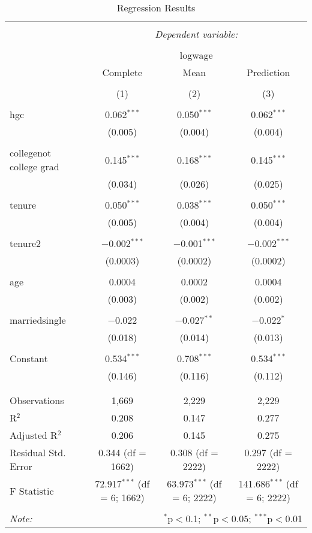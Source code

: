 \documentclass{article}
\begin{document}
\begin{table}[!htbp] \centering 
  \caption{Regression Results} 
  \label{} 
\begin{tabular}{@{\extracolsep{5pt}}lccc} 
\\[-1.8ex]\hline 
\hline \\[-1.8ex] 
 & \multicolumn{3}{c}{\textit{Dependent variable:}} \\ 
\cline{2-4} 
\\[-1.8ex] & \multicolumn{3}{c}{logwage} \\ 
 & Complete & Mean & Prediction \\ 
\\[-1.8ex] & (1) & (2) & (3)\\ 
\hline \\[-1.8ex] 
 hgc & 0.062$^{***}$ & 0.050$^{***}$ & 0.062$^{***}$ \\ 
  & (0.005) & (0.004) & (0.004) \\ 
  & & & \\ 
 collegenot college grad & 0.145$^{***}$ & 0.168$^{***}$ & 0.145$^{***}$ \\ 
  & (0.034) & (0.026) & (0.025) \\ 
  & & & \\ 
 tenure & 0.050$^{***}$ & 0.038$^{***}$ & 0.050$^{***}$ \\ 
  & (0.005) & (0.004) & (0.004) \\ 
  & & & \\ 
 tenure2 & $-$0.002$^{***}$ & $-$0.001$^{***}$ & $-$0.002$^{***}$ \\ 
  & (0.0003) & (0.0002) & (0.0002) \\ 
  & & & \\ 
 age & 0.0004 & 0.0002 & 0.0004 \\ 
  & (0.003) & (0.002) & (0.002) \\ 
  & & & \\ 
 marriedsingle & $-$0.022 & $-$0.027$^{**}$ & $-$0.022$^{*}$ \\ 
  & (0.018) & (0.014) & (0.013) \\ 
  & & & \\ 
 Constant & 0.534$^{***}$ & 0.708$^{***}$ & 0.534$^{***}$ \\ 
  & (0.146) & (0.116) & (0.112) \\ 
  & & & \\ 
\hline \\[-1.8ex] 
Observations & 1,669 & 2,229 & 2,229 \\ 
R$^{2}$ & 0.208 & 0.147 & 0.277 \\ 
Adjusted R$^{2}$ & 0.206 & 0.145 & 0.275 \\ 
Residual Std. Error & 0.344 (df = 1662) & 0.308 (df = 2222) & 0.297 (df = 2222) \\ 
F Statistic & 72.917$^{***}$ (df = 6; 1662) & 63.973$^{***}$ (df = 6; 2222) & 141.686$^{***}$ (df = 6; 2222) \\ 
\hline 
\hline \\[-1.8ex] 
\textit{Note:}  & \multicolumn{3}{r}{$^{*}$p$<$0.1; $^{**}$p$<$0.05; $^{***}$p$<$0.01} \\ 
\end{tabular} 
\end{table}
\end{document}
